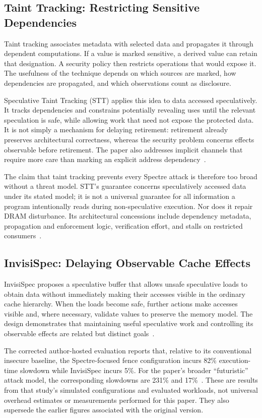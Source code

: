 \documentclass[man,12pt,apacite,nofontenc,nolmodern,floatsintext]{apa6}
\begin{document}
\subsection{Taint Tracking: Restricting Sensitive Dependencies}
Taint tracking associates metadata with selected data and propagates it through dependent computations. If a value is marked sensitive, a derived value can retain that designation. A security policy then restricts operations that would expose it. The usefulness of the technique depends on which sources are marked, how dependencies are propagated, and which observations count as disclosure.

Speculative Taint Tracking (STT) applies this idea to data accessed speculatively. It tracks dependencies and constrains potentially revealing uses until the relevant speculation is safe, while allowing work that need not expose the protected data. It is not simply a mechanism for delaying retirement: retirement already preserves architectural correctness, whereas the security problem concerns effects observable before retirement. The paper also addresses implicit channels that require more care than marking an explicit address dependency~\cite{stt2019}.

The claim that taint tracking prevents every Spectre attack is therefore too broad without a threat model. STT's guarantee concerns speculatively accessed data under its stated model; it is not a universal guarantee for all information a program intentionally reads during non-speculative execution. Nor does it repair DRAM disturbance. Its architectural concessions include dependency metadata, propagation and enforcement logic, verification effort, and stalls on restricted consumers~\cite{stt2019}.

\subsection{InvisiSpec: Delaying Observable Cache Effects}
InvisiSpec proposes a speculative buffer that allows unsafe speculative loads to obtain data without immediately making their accesses visible in the ordinary cache hierarchy. When the loads become safe, further actions make accesses visible and, where necessary, validate values to preserve the memory model. The design demonstrates that maintaining useful speculative work and controlling its observable effects are related but distinct goals~\cite{invisispec2018}.

The corrected author-hosted evaluation reports that, relative to its conventional insecure baseline, the Spectre-focused fence configuration incurs 82\% execution-time slowdown while InvisiSpec incurs 5\%. For the paper's broader ``futuristic'' attack model, the corresponding slowdowns are 231\% and 17\%~\cite{invisispec2018}. These are results from that study's simulated configurations and evaluated workloads, not universal overhead estimates or measurements performed for this paper. They also supersede the earlier figures associated with the original version.
\end{document}
